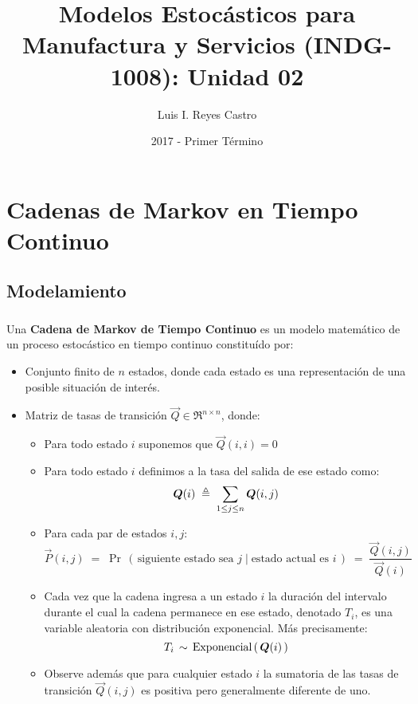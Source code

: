 \documentclass[ 10pt, xcolor = dvipsnames]{beamer}
\title[\shorttitle]{Modelos Estoc\'asticos para Manufactura y Servicios (INDG-1008): \textbf{Unidad 02} }
\author[L. I. Reyes Castro]{Luis I. Reyes Castro}
\institute[ESPOL]{\normalsize Escuela Superior Polit\'ecnica del Litoral (ESPOL) \\ Guayaquil - Ecuador}
\date[2017-T1]{2017 - Primer T\'ermino}
\begin{document}




\section{Cadenas de Markov en Tiempo Continuo}

\subsection{Modelamiento}

\begin{frame}[allowframebreaks]
\frametitle{\insertsubsection}

Una \textbf{Cadena de Markov de Tiempo Continuo} es un modelo matem\'atico de un proceso estoc\'astico en tiempo continuo constitu\'ido por: 
\begin{itemize}
\item Conjunto finito de $n$ estados, donde cada estado es una representaci\'on de una posible situaci\'on de inter\'es. 
\item Matriz de tasas de transici\'on $\vec{Q} \in \Re^{n \times n}$, donde: 
\begin{itemize}
\item Para todo estado $i$ suponemos que $\vec{Q}(i,i) = 0$
\item Para todo estado $i$ definimos a la tasa del salida de ese estado como: 
\[
{\boldsymbol{Q}}(i) \; \triangleq \; \sum_{ 1 \leq j \leq n } {\boldsymbol{Q}}(i,j)
\]
\fullcut
\item Para cada par de estados $i,j$: 
\[
\vec{P}(i,j) \; = \; 
\Pr \, ( \, \text{siguiente estado sea } j \mid \text{estado actual es } i \, ) \; = \; 
\frac{ \vec{Q}(i,j) }{ \; \vec{Q}(i) \; }
\]
\framebreak
\item Cada vez que la cadena ingresa a un estado $i$ la duraci\'on del intervalo \linebreak durante el cual la cadena permanece en ese estado, denotado $T_i$, es una variable aleatoria con distribuci\'on exponencial. M\'as precisamente: 
\[
T_i \, \sim \, \text{Exponencial} \, ( \, {\boldsymbol{Q}}(i) \, )
\]

\item Observe adem\'as que para cualquier estado $i$ la sumatoria de las tasas de transici\'on $\vec{Q}(i,j)$ es positiva pero generalmente diferente de uno. 
\end{itemize}
\end{itemize}

\end{frame}
\end{document}

